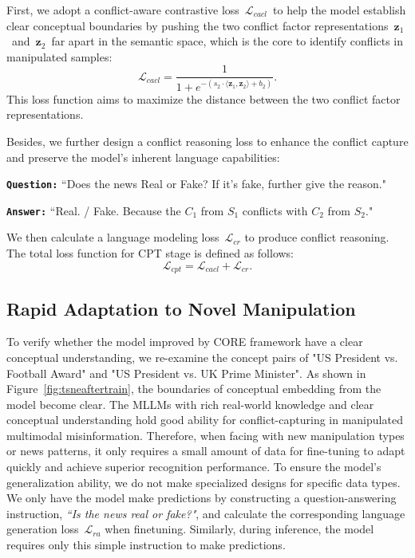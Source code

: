 \documentclass{article}
\theoremstyle{plain}
\theoremstyle{definition}
\theoremstyle{remark}
\begin{document}
First, we adopt a conflict-aware contrastive loss~$\mathcal{L}_{cacl}$~to help the model establish clear conceptual boundaries by pushing the two conflict factor representations~$\mathbf{z}_1$~and~$\mathbf{z}_2$~far apart in the semantic space, which is the core to identify conflicts in manipulated samples:
\begin{equation}
\mathcal{L}_{cacl} = \frac{1}{1 + e^{-(s_2 \cdot \langle \mathbf{z}_1, \mathbf{z}_2 \rangle + b_2)}}.
\label{eq:stage2_contrastive_loss}
\end{equation}
This loss function aims to maximize the distance between the two conflict factor representations.

Besides, we further design a conflict reasoning loss to enhance the conflict capture and preserve the model's inherent language capabilities:

\noindent\texttt{\textbf{Question:}} ``Does the news Real or Fake? If it's fake, further give the reason."

\noindent\texttt{\textbf{Answer:}} ``Real. / Fake. Because the $C_1$ from $S_1$ conflicts with $C_2$ from $S_2$."

We then calculate a language modeling loss~$\mathcal{L}_{cr}$ to produce conflict reasoning. The total loss function for CPT stage is defined as follows:
\begin{equation}
\mathcal{L}_{cpt} = \mathcal{L}_{cacl} + \mathcal{L}_{cr}.
\label{eq:stage2_loss}
\end{equation}





\subsection{Rapid Adaptation to Novel Manipulation}
To verify whether the model improved by CORE framework have a clear conceptual understanding, we re-examine the concept pairs of "US President vs. Football Award" and "US President vs. UK Prime Minister". As shown in  Figure~\ref{fig:tsneaftertrain}, the boundaries of conceptual embedding from the model become clear. The MLLMs with rich real-world knowledge and clear conceptual understanding hold good ability for conflict-capturing in manipulated multimodal misinformation.
Therefore, when facing with new manipulation types or news patterns, it only requires a small amount of data for fine-tuning to adapt quickly and achieve superior recognition performance. To ensure the model's generalization ability, we do not make specialized designs for specific data types. We only have the model make predictions by constructing a question-answering instruction, \textit{``Is the news real or fake?"}, and calculate the corresponding language generation loss~$\mathcal{L}_{ra}$ when finetuning. Similarly, during inference, the model requires only this simple instruction to make predictions.
\end{document}
